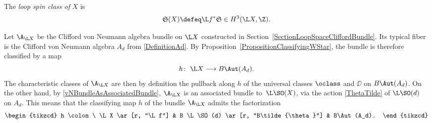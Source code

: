 \begin{Definition}
The \emph{loop spin class of} $X$ is
\begin{equation*}
\mathfrak{S}(X) \defeq \L f^* \mathfrak{S} \in H^3(\L X, \Z).
\end{equation*}
\end{Definition}

Let $\A_{\L X}$ be the Clifford von Neumann algebra bundle on $\L X$ constructed in Section~\ref{SectionLoopSpaceCliffordBundle}.
Its typical fiber is the Clifford von Neumann algebra $A_d$ from \eqref{DefinitionAd}.
By Proposition~\ref{PropositionClassifyingWStar}, the bundle is therefore classified by a map
\begin{equation*}
h\colon\ \L X \longrightarrow B\Aut(A_d).
\end{equation*}
The characteristic classes of $\A_{\L X}$ are then by definition the pullback along $h$ of the universal classes $\oclass$ and $\DD$ on $B\Aut(A_d)$. On the other hand, by \eqref{vNBundleAsAssociatedBundle}, $\A_{\L X}$ is an associated bundle to~$\L\SO(X)$, via the action \eqref{ThetaTilde} of $\L\SO(d)$ on $A_d$.
This means that the classifying map $h$ of the bundle $\A_{\L X}$ admits the factorization
\begin{equation*}
\begin{tikzcd}
 h \colon\ \L X \ar[r, "\L f"] %
 & B \L \SO(d) \ar[r, "B\tilde{\theta}"] & B\Aut(A_d).
\end{tikzcd}
\end{equation*}

